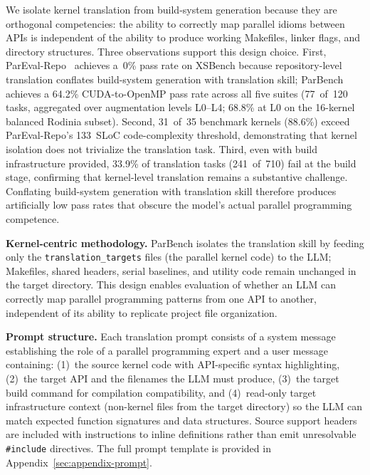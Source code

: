 \documentclass[conference]{IEEEtran}
\begin{document}
We isolate kernel translation from build-system generation because they are orthogonal competencies: the ability to correctly map parallel idioms between APIs is independent of the ability to produce working Makefiles, linker flags, and directory structures. Three observations support this design choice. First, ParEval-Repo~\cite{ParEvalRepo2025} achieves a~0\% pass rate on XSBench because repository-level translation conflates build-system generation with translation skill; ParBench achieves a 64.2\% CUDA-to-OpenMP pass rate across all five suites (77~of~120 tasks, aggregated over augmentation levels L0--L4; 68.8\% at L0 on the 16-kernel balanced Rodinia subset). Second, 31~of~35 benchmark kernels (88.6\%) exceed ParEval-Repo's 133~SLoC code-complexity threshold, demonstrating that kernel isolation does not trivialize the translation task. Third, even with build infrastructure provided, 33.9\% of translation tasks (241~of~710) fail at the build stage, confirming that kernel-level translation remains a substantive challenge. Conflating build-system generation with translation skill therefore produces artificially low pass rates that obscure the model's actual parallel programming competence.

\textbf{Kernel-centric methodology.} ParBench isolates the translation skill by feeding only the \texttt{translation\_targets} files (the parallel kernel code) to the LLM; Makefiles, shared headers, serial baselines, and utility code remain unchanged in the target directory. This design enables evaluation of whether an LLM can correctly map parallel programming patterns from one API to another, independent of its ability to replicate project file organization.

\textbf{Prompt structure.} Each translation prompt consists of a system message establishing the role of a parallel programming expert and a user message containing: (1)~the source kernel code with API-specific syntax highlighting, (2)~the target API and the filenames the LLM must produce, (3)~the target build command for compilation compatibility, and (4)~read-only target infrastructure context (non-kernel files from the target directory) so the LLM can match expected function signatures and data structures. Source support headers are included with instructions to inline definitions rather than emit unresolvable \texttt{\#include} directives. The full prompt template is provided in Appendix~\ref{sec:appendix-prompt}.
\end{document}
